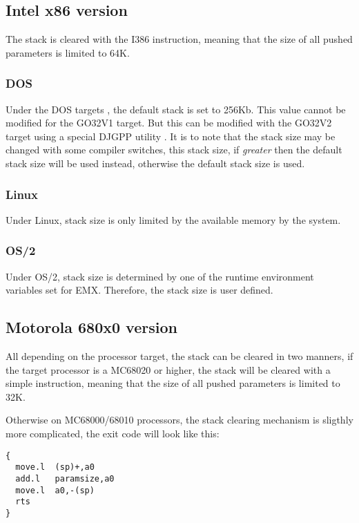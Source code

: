 \documentclass{report}
\begin{document}
\subsection{ Intel x86 version }

The stack is cleared with the  I386 instruction, meaning that the
size of all pushed parameters is limited to 64K.

\subsubsection{ DOS }

Under the DOS targets , the default stack is set to 256Kb. This value
cannot be modified for the GO32V1 target. But this can be modified
with the GO32V2 target using a special DJGPP utility .
It is to note that the stack size may be changed with some compiler
switches, this stack size, if \emph{greater} then the default stack
size will be used instead, otherwise the default stack size is used.

\subsubsection{ Linux }

Under Linux, stack size is only limited by the available memory by
the system.

\subsubsection{ OS/2 }

Under OS/2, stack size is determined by one of the runtime
environment variables set for EMX. Therefore, the stack size
is user defined.

\subsection{ Motorola 680x0 version }

All depending on the processor target, the stack can be cleared in two
manners, if the target processor is a MC68020 or higher, the stack will
be cleared with a simple  instruction, meaning that the size
of all pushed parameters is limited to 32K.

Otherwise on MC68000/68010 processors, the stack clearing mechanism
is sligthly more complicated, the exit code will look like this:

\begin{verbatim}
{
  move.l  (sp)+,a0
  add.l   paramsize,a0
  move.l  a0,-(sp)
  rts
}
\end{verbatim}
\end{document}
